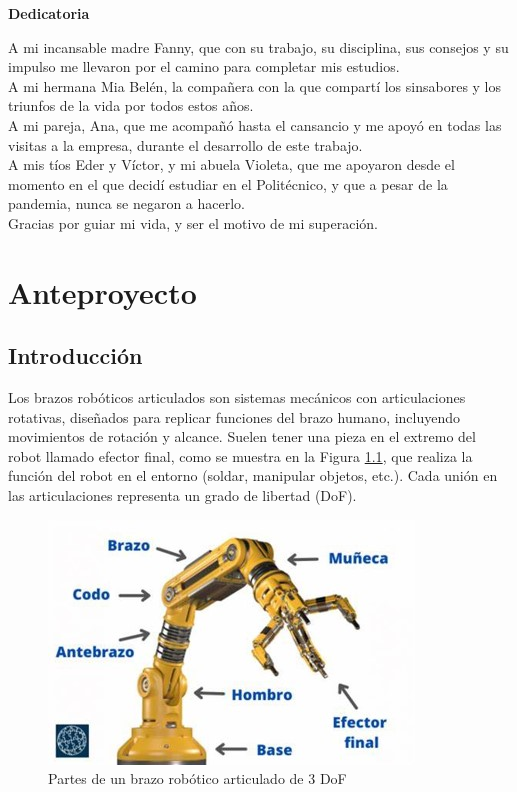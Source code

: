 \documentclass[12pt, twoside]{report}
\begin{document}
\newpage
\thispagestyle{empty}
\textbf{\Huge Dedicatoria}
\vspace{1cm}

A mi incansable madre Fanny, que con su trabajo, su disciplina, sus consejos y su impulso me llevaron por el camino para completar mis estudios.\\
A mi hermana Mia Belén, la compañera con la que compartí los sinsabores y los triunfos de la vida por todos estos años.\\
A mi pareja, Ana, que me acompañó hasta el cansancio y me apoyó en todas las visitas a la empresa, durante el desarrollo de este trabajo.\\
A mis tíos Eder y Víctor, y mi abuela Violeta, que me apoyaron desde el momento en el que decidí estudiar en el Politécnico, y que a pesar de la pandemia, nunca se negaron a hacerlo.\\
Gracias por guiar mi vida, y ser el motivo de mi superación.

\newpage
\renewcommand{\contentsname}{\'Indice}
\tableofcontents

\newpage
\chapter{Anteproyecto}

\section{Introducci\'on}

Los brazos robóticos articulados son sistemas mecánicos con articulaciones rotativas, diseñados para replicar funciones del brazo humano, incluyendo movimientos de rotación y alcance. Suelen tener una pieza en el extremo del robot llamado efector final, como se muestra en la Figura \ref{fig:brazoR}, que realiza la función del robot en el entorno (soldar, manipular objetos, etc.). Cada unión en las articulaciones representa un grado de libertad (DoF).

\begin{figure}[htb]
	\centering
	\includegraphics[scale=0.6]{brazo.jpg}
	\caption{Partes de un brazo robótico articulado de 3 DoF}
	\label{fig:brazoR}
\end{figure}
\end{document}

